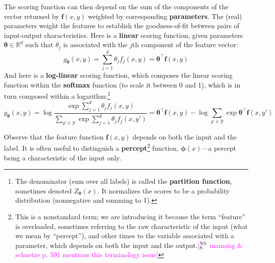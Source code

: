 \documentclass[11pt,letterpaper]{article}
\newcommand{\ensuretext}[1]{#1}
\newcommand{\nssmarker}{\ensuretext{\textcolor{magenta}{\ensuremath{^{\textsc{NS}}_{\textsc{S}}}}}}
\newcommand{\arkcomment}[3]{\ensuretext{\textcolor{#3}{[#1 #2]}}}
\newcommand{\nss}[1]{\arkcomment{\nssmarker}{#1}{magenta}}
\begin{document}
The scoring function can then depend on the sum of the components of the vector returned by $\mathbf{f}(x,y)$ weighted by corresponding {\bf parameters}.
The (real) parameters weight the features to establish the goodness-of-fit between pairs of input-output characteristics.  
Here is a {\bf linear} scoring function, 
given parameters $\boldsymbol{\theta}\in\mathbb{R}^d$ such that $\theta_j$ is associated with the $j$th component of the feature vector:
\begin{equation}\label{eq:linear}
g_{\boldsymbol{\theta}}(x,y) = \sum_{j=1}^d \theta_j f_j(x,y)
= \boldsymbol{\theta}^{\top} \mathbf{f}(x,y)
\end{equation}
And here is a {\bf log-linear} scoring function, which composes the linear scoring function within the 
{\bf softmax} function (to scale it between 0 and 1), which is in turn composed within a logarithm:\footnote{The denominator (sum over all labels) is called the {\bf partition function}, sometimes denoted $Z_{\boldsymbol{\theta}}(x)$. It normalizes the scores to be a probability distribution (nonnegative and summing to 1).}
\begin{equation}\label{eq:softmax}
g_{\boldsymbol{\theta}}(x,y) = \log\frac{\exp{\sum_{j=1}^d \theta_j f_j(x,y)}}{\sum_{y'\in\mathcal{Y}}\exp{\sum_{j=1}^d \theta_j f_j(x,y')}}
= \boldsymbol{\theta}^{\top} \mathbf{f}(x,y) - \log{\sum_{y'\in\mathcal{Y}}\exp{\boldsymbol{\theta}^{\top} \mathbf{f}(x,y')}}
\end{equation}

Observe that the feature function $\mathbf{f}(x,y)$ depends on both the input and the label.
It is often useful to distinguish a {\bf percept}\footnote{This is a nonstandard term; we are introducing 
it because the term ``feature'' is overloaded, sometimes referring to the raw characteristic of the input (what we mean by ``percept''),
and other times to the variable associated with a parameter, 
which depends on both the input and the output.\nss{manning \& schuetze p. 591 mentions this terminology issue}} function, 
$\boldsymbol{\phi}(x)$---a percept being a characteristic of the input only.
\end{document}
